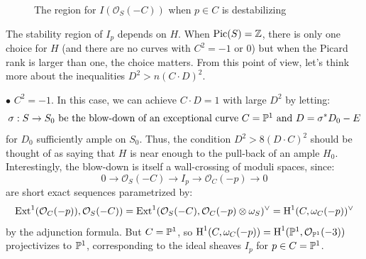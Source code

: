 \documentclass{amsart}
\begin{document}
\begin{figure}
\begin{center}
\end{center}

\caption{The region for $I({\mathcal O}_S(-C))$ when $p\in C$ is destabilizing}
\end{figure}

 The stability region of $I_p$ depends on $H$. When ${\rm Pic}(S) = {\mathbb Z}$, there is only one 
choice for $H$ (and there are no curves with $C^2 = -1$ or $0$) but when the Picard rank is larger than one, the choice matters. 
From this point of view, let's think more about the inequalities $D^2 > n (C \cdot D)^2$. 

\medskip

$\bullet$ $C^2 = -1$. In this case, we can achieve $C \cdot D = 1$ with large $D^2$ by letting: 
\[ \sigma: S \rightarrow S_0 \ \mbox{be the blow-down of an exceptional curve $C = \PP^1$ and}  \ D = \sigma^*D_0 - E \] 
for $D_0$ sufficiently ample on $S_0$. Thus, the condition $D^2 > 8(D \cdot C)^2$ should be thought of as saying that 
$H$ is near enough to the pull-back of an ample $H_0$. 
Interestingly, the blow-down is itself a wall-crossing of moduli spaces, since:  
\[ 0 \rightarrow {\mathcal O}_S(-C) \rightarrow I_p \rightarrow {\mathcal O}_C(-p) \rightarrow 0 \] 
are short exact sequences parametrized by: 
\[ \mbox{Ext}^1({\mathcal O}_C(-p)), {\mathcal O}_S(-C)) = \mbox{Ext}^1({\mathcal O}_S(-C), {\mathcal O}_C(-p) \otimes \omega_S)^\vee = \mbox{H}^1(C,\omega_C(-p)) ^\vee \] 
by the adjunction formula. But $C = {\mathbb P}^1$, so $\mbox{H}^1(C, \omega_C(-p)) = \mbox{H}^1({\mathbb P}^1, {\mathcal O}_{{\mathbb P}^1}(-3))$ projectivizes to ${\mathbb P}^1$, corresponding to the ideal sheaves $I_p$ for $p \in C = {\mathbb P}^1$.
\end{document}
